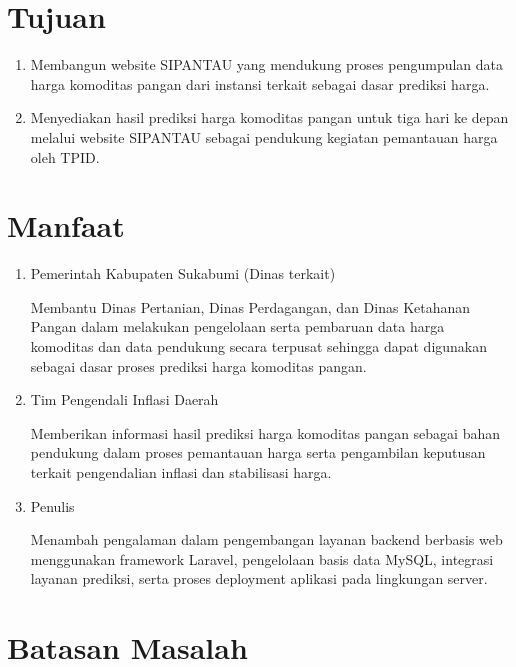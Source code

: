 \section{Tujuan}

\begin{enumerate}
\item Membangun website SIPANTAU yang mendukung proses pengumpulan data harga komoditas pangan dari instansi terkait sebagai dasar prediksi harga.
\item Menyediakan hasil prediksi harga komoditas pangan untuk tiga hari ke depan melalui website SIPANTAU sebagai pendukung kegiatan pemantauan harga oleh TPID.
\end{enumerate}


\section{Manfaat}

\begin{enumerate}
\item Pemerintah Kabupaten Sukabumi (Dinas terkait) \par
Membantu Dinas Pertanian, Dinas Perdagangan, dan Dinas Ketahanan Pangan dalam melakukan pengelolaan serta pembaruan data harga komoditas dan data pendukung secara terpusat sehingga dapat digunakan sebagai dasar proses prediksi harga komoditas pangan.
\item Tim Pengendali Inflasi Daerah \par
Memberikan informasi hasil prediksi harga komoditas pangan sebagai bahan pendukung dalam proses pemantauan harga serta pengambilan keputusan terkait pengendalian inflasi dan stabilisasi harga.
\item Penulis \par
Menambah pengalaman dalam pengembangan layanan backend berbasis web menggunakan framework Laravel, pengelolaan basis data MySQL, integrasi layanan prediksi, serta proses deployment aplikasi pada lingkungan server.
\end{enumerate}



\section{Batasan Masalah}

